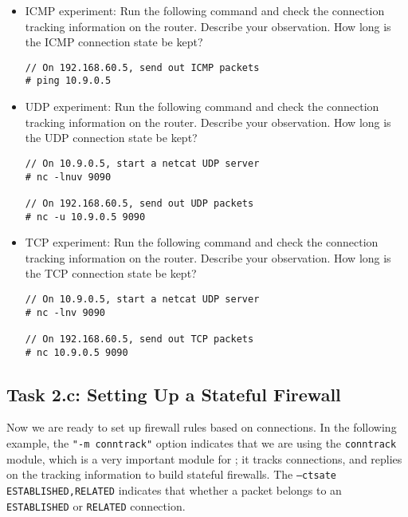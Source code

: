 \begin{itemize}
\item ICMP experiment: Run the following command and 
check the connection tracking information on the router. Describe
your observation. How long is the ICMP connection state be kept? 

\begin{lstlisting}
// On 192.168.60.5, send out ICMP packets
# ping 10.9.0.5
\end{lstlisting}

\item UDP experiment: Run the following command and 
check the connection tracking information on the router. Describe
your observation. How long is the UDP connection state be kept? 


\begin{lstlisting}
// On 10.9.0.5, start a netcat UDP server
# nc -lnuv 9090

// On 192.168.60.5, send out UDP packets 
# nc -u 10.9.0.5 9090
\end{lstlisting}


\item TCP experiment: Run the following command and 
check the connection tracking information on the router. Describe
your observation. How long is the TCP connection state be kept? 

\begin{lstlisting}
// On 10.9.0.5, start a netcat UDP server
# nc -lnv 9090

// On 192.168.60.5, send out TCP packets 
# nc 10.9.0.5 9090
\end{lstlisting}

\end{itemize}
 


\subsection{Task 2.c: Setting Up a Stateful Firewall} 


Now we are ready to set up firewall rules based on connections. 
In the following example, 
the \texttt{"-m conntrack"} option indicates that we are using the \texttt{conntrack} module,
which is a very important module for \iptables; it tracks connections, and
\iptables replies on the tracking information to build stateful firewalls. 
The \texttt{--ctsate ESTABLISHED,RELATED} indicates that whether a packet
belongs to an \texttt{ESTABLISHED} or \texttt{RELATED} connection.

